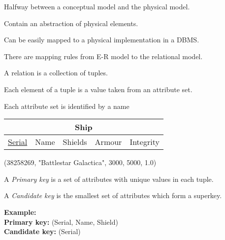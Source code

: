 \documentclass{beamer}
\begin{document}
\begin{slide}{
\item Halfway between a conceptual model and the physical model.
\item Contain an abstraction of physical elements.
\item Can be easily mapped to a physical implementation in a DBMS.
\item There are mapping rules from E-R model to the relational model.
}\end{slide}

\begin{slide}{
\item A relation is a collection of tuples.
\item Each element of a tuple is a value taken from an attribute set.
\item Each attribute set is identified by a name

\vspace{0.5cm}
\centering
\begin{tabular}{|c|c|c|c|c|}
\hline
\multicolumn{5}{|c|}{\textbf{Ship}} \\
\hline
\underline{Serial} & Name & Shields & Armour & Integrity \\
\hline
\end{tabular}

\vspace{0.5cm}
(38258269, "Battlestar Galactica", 3000, 5000, 1.0)
}\end{slide}

\begin{slide}{
\item A \textit{Primary key} is a set of attributes with unique values in each tuple.
\item A \textit{Candidate key} is the smallest set of attributes which form a superkey.

\vspace{0.5cm}
\textbf{Example:}\\
\textbf{Primary key:} (Serial, Name, Shield) \\
\textbf{Candidate key:} (Serial)
}\end{slide}
\end{document}
